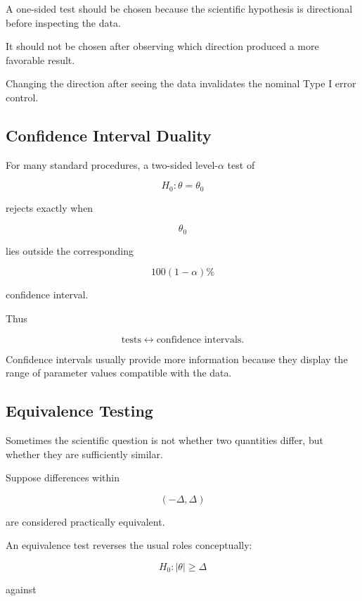 A one-sided test should be chosen because the scientific hypothesis is
directional before inspecting the data.

It should not be chosen after observing which direction produced a more
favorable result.

Changing the direction after seeing the data invalidates the nominal
Type I error control.

\subsection{Confidence Interval Duality}
\label{subsec:testing-confidence-duality}

For many standard procedures, a two-sided level-\(\alpha\) test of

\[
H_0:\theta=\theta_0
\]

rejects exactly when

\[
\theta_0
\]

lies outside the corresponding

\[
100(1-\alpha)\%
\]

confidence interval.

Thus

\[
\boxed{
\text{tests}
\leftrightarrow
\text{confidence intervals}.
}
\]

Confidence intervals usually provide more information because they
display the range of parameter values compatible with the data.

\subsection{Equivalence Testing}
\label{subsec:equivalence-testing-preview}

Sometimes the scientific question is not whether two quantities differ,
but whether they are sufficiently similar.

Suppose differences within

\[
(-\Delta,\Delta)
\]

are considered practically equivalent.

An equivalence test reverses the usual roles conceptually:

\[
\boxed{
H_0:
|\theta|\geq\Delta
}
\]

against

